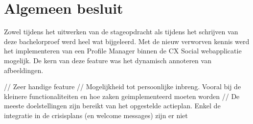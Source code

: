 \chapter{Algemeen besluit}

Zowel tijdens het uitwerken van de stageopdracht als tijdens het schrijven van deze bachelorproef werd heel wat bijgeleerd. Met de nieuw verworven kennis werd het implementeren van een Profile Manager binnen de CX Social webapplicatie mogelijk. De kern van deze feature was het dynamisch annoteren van afbeeldingen. 

// Zeer handige feature
// Mogelijkheid tot persoonlijke inbreng. Vooral bij de kleinere functionaliteiten en hoe zaken geimplementeerd moeten worden
// De meeste doelstellingen zijn bereikt van het opgestelde actieplan. Enkel de integratie in de crisisplans (en welcome messages) zijn er niet 
